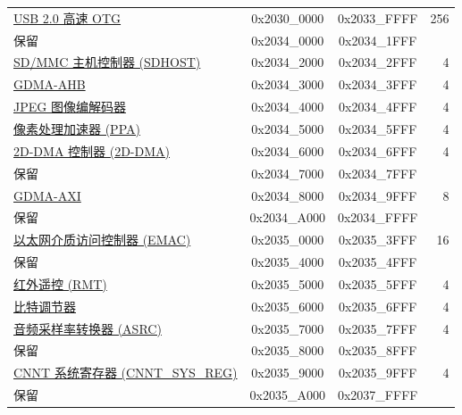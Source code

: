 \begin{ThreePartTable}
\begin{longtable}[c]{ |p{7cm}|c|c|r| }
        \rowcolor{lightgray}\multicolumn{4}{|l|}{\textbf{HP 外设}}\\\hline
    \hyperref[mod:usbotghs]{USB 2.0 高速 OTG} & 0x2030\_0000 & 0x2033\_FFFF & 256\\\hline
     \rowcolor{gray!25}  保留          & 0x2034\_0000 & 0x2034\_1FFF &    \\\hline
    \hyperref[mod:sdhost]{SD/MMC 主机控制器 (SDHOST)} & 0x2034\_2000 & 0x2034\_2FFF &   4\\\hline
    \hyperref[mod:dma]{GDMA-AHB} & 0x2034\_3000 & 0x2034\_3FFF &   4\\\hline
    \hyperref[mod:jpegcodec]{JPEG 图像编解码器} & 0x2034\_4000 & 0x2034\_4FFF &   4\\\hline
    \hyperref[mod:ppa]{像素处理加速器 (PPA)} & 0x2034\_5000 & 0x2034\_5FFF &   4\\\hline
    \hyperref[mod:2ddma]{2D-DMA 控制器 (2D-DMA)} & 0x2034\_6000 & 0x2034\_6FFF &   4\\\hline
        \rowcolor{gray!25}  保留          & 0x2034\_7000 & 0x2034\_7FFF &    \\\hline
    \hyperref[mod:dma]{GDMA-AXI} & 0x2034\_8000 & 0x2034\_9FFF &   8\\\hline
        \rowcolor{gray!25}  保留          & 0x2034\_A000 & 0x2034\_FFFF &    \\\hline
    \hyperref[mod:ethernetmac]{以太网介质访问控制器 (EMAC)} & 0x2035\_0000 & 0x2035\_3FFF &  16\\\hline
        \rowcolor{gray!25}  保留          & 0x2035\_4000 & 0x2035\_4FFF &    \\\hline
    \hyperref[mod:rmt]{红外遥控 (RMT)}    & 0x2035\_5000 & 0x2035\_5FFF &   4\\\hline
    \hyperref[mod:bitscrm]{比特调节器} & 0x2035\_6000 & 0x2035\_6FFF &   4\\\hline
    \hyperref[mod:asrc]{音频采样率转换器 (ASRC)} & 0x2035\_7000 & 0x2035\_7FFF &   4\\\hline
        \rowcolor{gray!25}  保留          & 0x2035\_8000 & 0x2035\_8FFF &    \\\hline
   \hyperref[mod:sysreg]{CNNT 系统寄存器 (CNNT\_SYS\_REG)}        & 0x2035\_9000 & 0x2035\_9FFF &   4\\\hline
        \rowcolor{gray!25}  保留          & 0x2035\_A000 & 0x2037\_FFFF &    \\\hline


\end{longtable}
\end{ThreePartTable}
